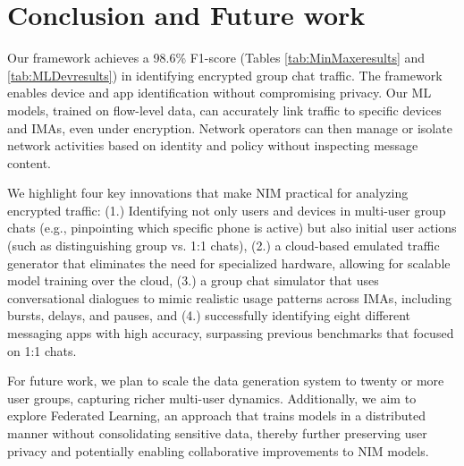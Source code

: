 \documentclass[conference]{IEEEtran}
\begin{document}
\section{Conclusion and Future work}
Our framework achieves a 98.6\% F1-score (Tables \ref{tab:MinMaxeresults} and \ref{tab:MLDevresults}) in identifying encrypted group chat traffic. The framework enables device and app identification without compromising privacy. Our ML models, trained on flow-level data, can accurately link traffic to specific devices and IMAs, even under encryption. Network operators can then manage or isolate network activities based on identity and policy without inspecting message content.

We highlight four key innovations that make NIM practical for analyzing encrypted traffic: (1.) Identifying not only users and devices in multi-user group chats (e.g., pinpointing which specific phone is active) but also initial user actions (such as distinguishing group vs. 1:1 chats), (2.) a cloud-based emulated traffic generator that eliminates the need for specialized hardware, allowing for scalable model training over the cloud, (3.) a group chat simulator that uses conversational dialogues to mimic realistic usage patterns across IMAs, including bursts, delays, and pauses, and (4.) successfully identifying eight different messaging apps with high accuracy, surpassing previous benchmarks that focused on 1:1 chats.

For future work, we plan to scale the data generation system to twenty or more user groups, capturing richer multi-user dynamics. Additionally, we aim to explore Federated Learning, an approach that trains models in a distributed manner without consolidating sensitive data, thereby further preserving user privacy and potentially enabling collaborative improvements to NIM models. 
\end{document}
